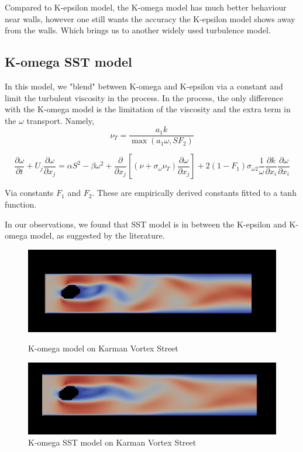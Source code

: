 \documentclass{article}
\begin{document}
Compared to K-epsilon model, the K-omega model has much better behaviour near walls, however one still wants the accuracy the K-epsilon model shows away from the walls. Which brings us to another widely used turbulence model.

\subsection{K-omega SST model}

In this model, we "blend" between K-omega and K-epsilon via a constant and limit the turbulent viscosity in the process. In the process, the only difference with the K-omega model is the limitation of the viscosity and the extra term in the $\omega$ transport. Namely,
\begin{equation}
\nu_{T}=\frac{a_{1} k}{\max \left(a_{1} \omega, S F_{2}\right)}
\end{equation}

\begin{equation}
\frac{\partial \omega}{\partial t}+U_{j} \frac{\partial \omega}{\partial x_{j}}=\alpha S^{2}-\beta \omega^{2}+\frac{\partial}{\partial x_{j}}\left[\left(\nu+\sigma_{\omega} \nu_{T}\right) \frac{\partial \omega}{\partial x_{j}}\right]+2\left(1-F_{1}\right) \sigma_{\omega 2} \frac{1}{\omega} \frac{\partial k}{\partial x_{i}} \frac{\partial \omega}{\partial x_{i}}
\end{equation}

Via constants $F_1$ and $F_2$. These are empirically derived constants fitted to a tanh function.

In our observations, we found that SST model is in between the K-epsilon and K-omega model, as suggested by the literature.

\begin{figure}
\centering
  \centering
  \includegraphics[width=.6\linewidth]{komega.png}
  \caption{K-omega model on Karman Vortex Street}
  \label{fig:sub1}
  \centering
  \includegraphics[width=.6\linewidth]{sst.png}
  \caption{K-omega SST model on Karman Vortex Street}
  \label{fig:sub2}
\label{fig:test}
\end{figure}
\end{document}
